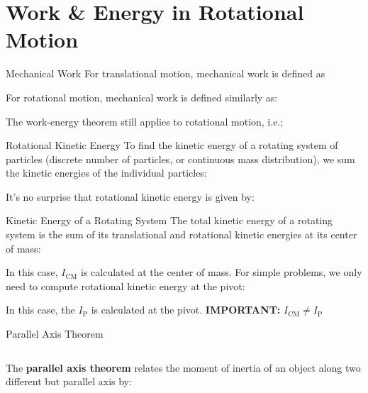 \documentclass[12pt,compress,aspectratio=169]{beamer}
\begin{document}
  
\section{Work \& Energy in Rotational Motion}

\begin{frame}{Mechanical Work}
  For translational motion, mechanical work is defined as


  For rotational motion, mechanical work is defined similarly as:


  The work-energy theorem still applies to rotational motion, i.e.;

\end{frame}


\begin{frame}{Rotational Kinetic Energy}
  To find the kinetic energy of a rotating system of particles (discrete number
  of particles, or continuous mass distribution), we sum the
  kinetic energies of the individual particles:
    
  
  It's no surprise that rotational kinetic energy is given by:
  
\end{frame}



\begin{frame}{Kinetic Energy of a Rotating System}
  The total kinetic energy of a rotating system is the sum of its translational
  and rotational kinetic energies at its center of mass:

  
  In this case, $I_\text{CM}$ is calculated at the center of
  mass. For simple problems, we only need to compute rotational kinetic energy
  at the pivot:

  
  In this case, the $I_\text{P}$ is calculated at the pivot.
  \textbf{IMPORTANT:} $I_\text{CM}\neq I_\text{P}$
\end{frame}



\begin{frame}{Parallel Axis Theorem}
  \begin{columns}
    
    The \textbf{parallel axis theorem} relates the moment of inertia of an
    object along two different but parallel axis by:

  \end{columns}
\end{frame}
\end{document}
